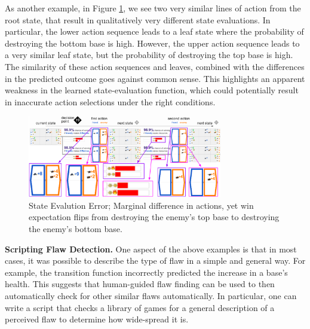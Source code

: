 \documentclass{article}
\begin{document}
As another example, in Figure \ref{fig:winSwap}, we see two very similar lines of action from the root state, that result in qualitatively very different state evaluations. In particular, the lower action sequence leads to a leaf state where the probability of destroying the bottom base is high. However, the upper action sequence leads to a very similar leaf state, but the probability of destroying the top base is high. The similarity of these action sequences and leaves, combined with the differences in the predicted outcome goes against common sense. This highlights an apparent weakness in the learned state-evaluation function, which could potentially result in inaccurate action selections under the right conditions. 


\begin{figure}[tp]
    \centering
    \includegraphics[width=8.5cm]{img/bugs/winSwap.PNG}
    \caption{State Evalution Error; Marginal difference in actions, yet win expectation flips from destroying the enemy's top base to destroying the enemy's bottom base.}
    \label{fig:winSwap}
\end{figure}

{\bf Scripting Flaw Detection.} One aspect of the above examples is that in most cases, it was possible to describe the type of flaw in a simple and general way. For example, the transition function incorrectly predicted the increase in a base's health. This suggests that human-guided flaw finding can be used to then automatically check for other similar flaws automatically. In particular, one can write a script that checks a library of games for a general description of a perceived flaw to determine how wide-spread it is. 
\end{document}
